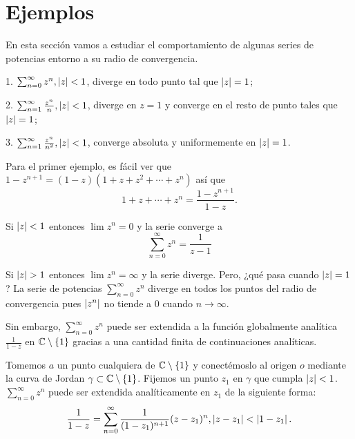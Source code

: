 \chapter{Ejemplos}

En esta sección vamos a estudiar el comportamiento de algunas series de potencias entorno a su radio de convergencia.

1. $\sum_{n=0}^{\infty} z^n, \left\lvert z\right\rvert < 1$, diverge en todo punto tal que $\left\lvert z\right\rvert = 1$;

2. $\sum_{n=1}^{\infty} \frac{z^n}{n}, \left\lvert z\right\rvert < 1$, diverge en $z = 1$  y converge en el resto de punto tales que $\left\lvert z\right\rvert = 1$;

3. $\sum_{n=1}^{\infty} \frac{z^n}{n^2}, \left\lvert z\right\rvert < 1$, converge absoluta y uniformemente en $\left\lvert z\right\rvert = 1$. \\ \par


Para el primer ejemplo, es fácil ver que $1 - z^{n+1} = (1 - z) (1+ z + z^2 + \cdots + z^n)$ así que
\begin{equation}
    1 + z + \cdots + z^n = \frac{1 - z^{n+1}}{1-z}.
\end{equation}

Si $\left\lvert z\right\rvert < 1$ entonces $\lim z^n = 0$ y la serie converge a
\begin{equation*}
    \sum_{n=0}^{\infty} z^n = \frac{1}{z - 1}
\end{equation*}

Si $\left\lvert z\right\rvert > 1$ entonces $\lim z^n = \infty$ y la serie diverge. Pero, ¿qué pasa cuando $\left\lvert z\right\rvert = 1$? La serie de potencias $\sum_{n=0}^{\infty} z^n$ diverge en todos los puntos del radio de convergencia pues $\left\lvert z^n\right\rvert$ no tiende a 0 cuando $n \rightarrow \infty$.

Sin embargo, $\sum_{n=0}^{\infty} z^n$ puede ser extendida a la función globalmente analítica $\frac{1}{1-z}$ en $\mathbb{C} \setminus \{1\}$ gracias a una cantidad finita de continuaciones analíticas.

Tomemos $a$ un punto cualquiera de $\mathbb{C} \setminus \{1\}$ y conectémoslo al origen $o$ mediante la curva de Jordan $\gamma \subset \mathbb{C} \setminus \{1\}$. Fijemos un punto $z_1$ en $\gamma$ que cumpla $\left\lvert z\right\rvert < 1$. $\sum_{n=0}^{\infty} z^n$ puede ser extendida analíticamente en $z_1$ de la siguiente forma:
\begin{equation*}
    \frac{1}{1-z} = \sum_{n=0}^{\infty} \frac{1}{(1 - z_1)^{n+1}} (z - z_1)^n , \left\lvert z - z_1\right\rvert < \left\lvert1 - z_1\right\rvert.
\end{equation*}

